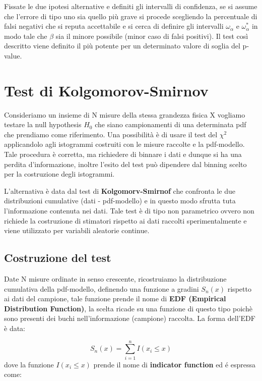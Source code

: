 \noindent Fissate le due ipotesi alternative e definiti gli intervalli di confidenza, se si assume che l'errore di tipo uno sia quello pi\`{u} grave si procede scegliendo la percentuale di falsi negativi che si reputa accettabile e si cerca di definire gli intervalli $\omega_\alpha$ e $\omega_\alpha^*$ in modo tale che $\beta$ sia il minore possibile (minor caso di falsi positivi). Il test cos\`{i} descritto viene definito il pi\`{u} potente per un determinato valore di soglia del p-value.

\section{Test di Kolgomorov-Smirnov}

Consideriamo un insieme di N misure della stessa grandezza fisica X vogliamo testare la null hypothesis $H_0$ che siano campionamenti di una determinata pdf che prendiamo come riferimento. Una possibilit\`{a} \`{e} di usare il test del $\chi^2$ applicandolo agli istogrammi costruiti con le misure raccolte e la pdf-modello. Tale procedura \`{e} corretta, ma richiedere di binnare i dati e dunque si ha una perdita d'informazione, inoltre l'esito del test pu\`{o} dipendere dal binning scelto per la costruzione degli istogrammi.

L'alternativa \`{e} data dal test di \textbf{Kolgomorv-Smirnof} che confronta le due distribuzioni cumulative (dati - pdf-modello) e in questo modo sfrutta tuta l'informazione contenuta nei dati. Tale test \`{e} di tipo non parametrico ovvero non richiede la costruzione di stimatori rispetto ai dati raccolti sperimentalmente e viene utilizzato per variabili aleatorie continue. 


\subsection{Costruzione del test}

Date N misure ordinate in senso crescente, ricostruiamo la distribuzione cumulativa della pdf-modello, definendo una funzione a gradini $S_n (x)$ rispetto ai dati del campione, tale funzione prende il nome di \textbf{EDF (Empirical Distribution Function)}, la scelta ricade su una funzione di questo tipo poich\`{e} sono presenti dei buchi nell'informazione (campione) raccolta. La forma dell'EDF \`{e} data:

\begin{equation}
	S_n(x) = \sum_{i=1}^nI(x_i \leq x)  
\end{equation}
dove la funzione $I(x_i \leq x)$ prende il nome di \textbf{indicator function} ed \'{e} espressa come:

